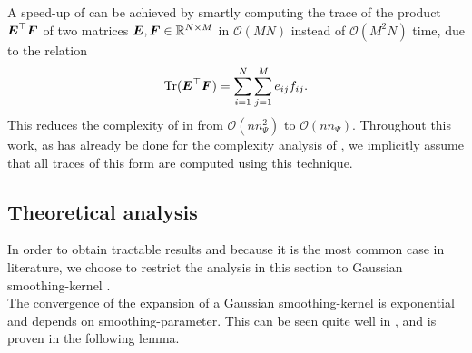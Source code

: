 
A speed-up of  can be achieved by smartly computing the trace of the 
product $\boldsymbol{E}^{\top}\boldsymbol{F}$ of two matrices $\boldsymbol{E}, \boldsymbol{F} \in \mathbb{R}^{N \times M}$ in
$\mathcal{O}(MN)$ instead of $\mathcal{O}(M^2N)$ time, due to the relation
\begin{equation}
    \operatorname{Tr}(\boldsymbol{E}^{\top}\boldsymbol{F}) = \sum_{i=1}^{N} \sum_{j=1}^{M} e_{ij} f_{ij}.
    \label{equ:2-chebyshev-fast-trace}
\end{equation}
This reduces the complexity of 
in  from $\mathcal{O}(nn_{\Psi}^2)$ to $\mathcal{O}(nn_{\Psi})$.
Throughout this work, as has already be done for the complexity analysis
of , we implicitly assume that all traces of this
form are computed using this technique.

\subsection{Theoretical analysis}
\label{subsec:2-chebyshev-theoretical-analysis}

In order to obtain tractable results and because it is the most common case in
literature, we choose to restrict the analysis in this section to Gaussian 
\gls{smoothing-kernel} .\\

The convergence of the expansion of a Gaussian \gls{smoothing-kernel} is exponential
and depends on \gls{smoothing-parameter}. This can be seen quite well
in , and is proven in the following
lemma.

